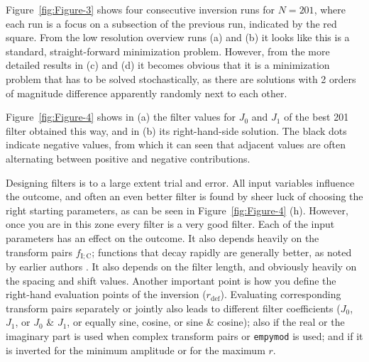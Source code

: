 \documentclass[paper,twocolumn,twoside]{geophysics}
\newcommand{\mr}[1]{\mathrm{#1}}
\begin{document}
Figure~\ref{fig:Figure-3} shows four consecutive inversion runs for $N=201$,
where each run is a focus on a subsection of the previous run, indicated by the
red square. From the low resolution overview runs (a) and (b) it looks like
this is a standard, straight-forward minimization problem. However, from the
more detailed results in (c) and (d) it becomes obvious that it is a
minimization problem that has to be solved stochastically, as there are
solutions with 2 orders of magnitude difference apparently randomly next to
each other.
%
%
%

Figure~\ref{fig:Figure-4} shows in (a) the filter values for $J_0$ and $J_1$ of
the best 201  filter obtained this way, and in (b) its
right-hand-side solution. The black dots indicate negative values, from which
it can  seen that adjacent values are often alternating between
positive and negative contributions.
%
%

Designing filters is to a large extent trial and error. All input variables
influence the outcome, and often an even better filter is found by sheer luck
of choosing the right starting parameters, as can be seen in
Figure~\ref{fig:Figure-4} (h). However, once you are in this zone every filter
is a very good filter. Each of the input parameters has an effect on the
outcome. It also depends heavily on the transform pairs $f_\mr{I;C}$; functions
that decay rapidly are generally better, as noted by earlier authors
\citep[e.g.][]{USGS.75.Anderson}. It also depends on the filter length, and
obviously heavily on the spacing and shift values. Another important point is
how you define the right-hand evaluation points of the inversion
($r_\mr{def}$). Evaluating corresponding transform pairs separately or jointly
also leads to different filter coefficients ($J_0$, $J_1$, or $J_0$ \& $J_1$,
or equally sine, cosine, or sine \& cosine); also if the real or the imaginary
part is used when complex transform pairs or \texttt{empymod} is used; and if
it is inverted for the minimum amplitude or for the maximum $r$.
\end{document}
